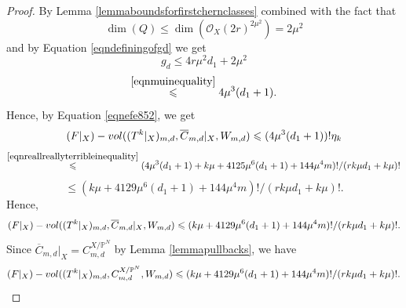 \documentclass[10pt,a4paper]{amsart}
\newcommand{\Vol}{\textnormal{-vol}}
\newcommand{\bP}{\mathbb{P}}
\newcommand{\calO}{\mathcal{O}}
\renewcommand{\leq}{\leqslant}
\begin{document}
\begin{proof}
	By Lemma \ref{lemmaboundsforfirstchernclasses} combined with the fact that
	\begin{equation}
		\dim(Q) \leq \dim(\calO_X(2r)^{2\mu^2}) = 2\mu^2
	\end{equation}
	and by Equation \eqref{eqndefiningofgd}
	we get
	\begin{equation}
		g_d \leq
		4r\mu^2d_1  + 2\mu^2
	\end{equation}
	\begin{equation}
		\overset{\textnormal{\eqref{eqnmuinequality}}}{\leq} 4\mu^3(d_1+1).
	\end{equation}
	Hence, by Equation \eqref{eqnefe852}, we get
	\begin{equation} \label{eqnefe853}
		(F|_X)\Vol((T^k|_X)_{m,d},\overline{C}_{m,d}|_X,W_{m,d}) \leq (4\mu^3(d_1+1))! \eta_k
	\end{equation}
	\begin{equation}
		\overset{\textnormal{\eqref{eqnreallreallyterribleinequality}}}{\leq} (4\mu^3(d_1+1)+k\mu+ 4125\mu^6(d_1+1) + 144\mu^4m)!
		/ (rk\mu d_1 + k\mu)!
	\end{equation}
	\begin{equation}
		\leq (k\mu+ 4129\mu^6(d_1+1) + 144\mu^4m)!
		/ (rk\mu d_1 + k\mu)!.
	\end{equation}
	Hence,
	\begin{equation} \label{eqnefe8541}
		(F|_X)\Vol((T^k|_X)_{m,d},\overline{C}_{m,d}|_X,W_{m,d}) \leq (k\mu+ 4129\mu^6(d_1+1) + 144\mu^4m)!
		/ (rk\mu d_1 + k\mu)!.
	\end{equation}
	Since $\overline{C}_{m,d}|_X = C^{X/\bP^N}_{m,d}$ by Lemma \ref{lemmapullbacks}, we have
	\begin{equation} \label{eqnefe854}
		(F|_X)\Vol((T^k|_X)_{m,d}, C^{X/\bP^N}_{m,d}, W_{m,d}) \leq (k\mu+ 4129\mu^6(d_1+1) + 144\mu^4m)!
		/ (rk\mu d_1 + k\mu)!.
	\end{equation}



\end{proof}
\end{document}
